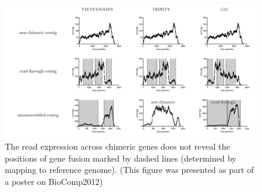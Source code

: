 		\begin{figure}%
			\includegraphics[width=\columnwidth]{images/conclusions_chimeraByExpression}%
			\caption{The read expression across chimeric genes does not reveal the positions of gene fusion marked by dashed lines (determined by mapping to reference genome). (This figure was presented as part of a poster on BioComp2012)}%
			\label{fig:conclusions_chimeraByExpression}%
		\end{figure}
